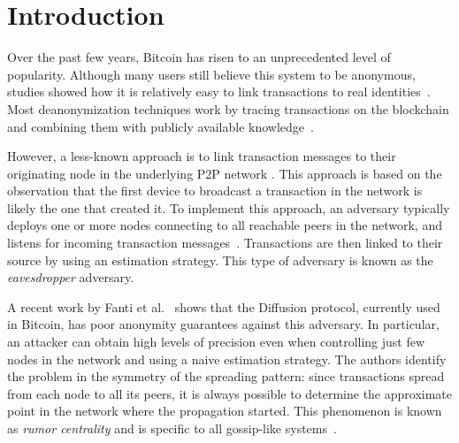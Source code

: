 \documentclass{article}
\begin{document}
	\section{Introduction}
	Over the past few years, Bitcoin \cite{nakamoto2008peer} has risen to an unprecedented level of popularity.
	Although many users still believe this system to be anonymous, studies showed how it is relatively easy to link transactions to real identities~\cite{androulaki2013evaluating,reid2013analysis,herrera2015research}.
	Most deanonymization techniques work by tracing transactions on the blockchain and combining them with publicly available knowledge~\cite{meiklejohn2013fistful,nick2015data,neudecker2017could}.
	
	However, a less-known approach is to link transaction messages to their originating node in the underlying P2P network \cite{biryukov2014deanonymisation,koshy2014analysis,biryukov2015tor}.
	This approach is based on the observation that the first device to broadcast a transaction in the network is likely the one that created it.
	To implement this approach, an adversary typically deploys one or more nodes connecting to all reachable peers in the network, and listens for incoming transaction messages~\cite{fanti2017deanonimization}.
	Transactions are then linked to their source by using an estimation strategy.
	This type of adversary is known as the \textit{eavesdropper} adversary.
	
	A recent work by Fanti et al.~\cite{fanti2017anonymity} shows that the Diffusion protocol, currently used in Bitcoin, has poor anonymity guarantees against this adversary.
	In particular, an attacker can obtain high levels of precision even when controlling just few nodes in the network and using a naive estimation strategy.
	The authors identify the problem in the symmetry of the spreading pattern: since transactions spread from each node to all its peers, it is always possible to determine the approximate point in the network where the propagation started.
	This phenomenon is known as \textit{rumor centrality} and is specific to all gossip-like systems~\cite{shah2012rumor,shah2011rumors}.
	
\end{document}
